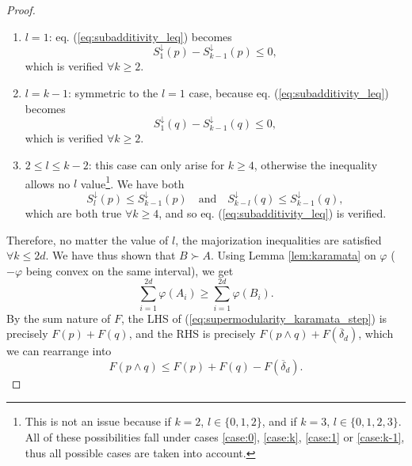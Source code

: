 \begin{proof}
\begin{enumerate}[resume]
        \item \underline{$l = 1$}: eq. (\ref{eq:subadditivity_leq}) becomes \label{case:1}
        \begin{equation}
            S^\downarrow_1(p) - S^\downarrow_{k-1}(p) \leq 0,
        \end{equation}
        which is verified $\forall k \geq 2$.
        \item \underline{$l = k - 1$}: symmetric to the $l = 1$ case, because eq. (\ref{eq:subadditivity_leq}) becomes \label{case:k-1}
        \begin{equation}
            S^\downarrow_1(q) - S^\downarrow_{k-1}(q) \leq 0,
        \end{equation}
        which is verified $\forall k \geq 2$.
        \item \underline{$2 \leq l \leq k-2$}: this case can only arise for $k \geq 4$, otherwise the inequality allows no $l$ value\footnote{This is not an issue because if $k=2$, $l \in \{0, 1, 2\}$, and if $k = 3$, $l \in \{0, 1, 2, 3\}$. All of these possibilities fall under cases \ref{case:0}, \ref{case:k}, \ref{case:1} or \ref{case:k-1}, thus all possible cases are taken into account.}. We have both \label{case:rest}
        \begin{equation}
            S^\downarrow_l (p) \leq S^\downarrow_{k-1}(p) \quad \text{and} \quad S^\downarrow_{k-l} (q) \leq S^\downarrow_{k-1}(q),
        \end{equation}
        which are both true $\forall k \geq 4$, and so eq. (\ref{eq:subadditivity_leq}) is verified. %
    \end{enumerate}
    Therefore, no matter the value of $l$, the majorization inequalities are satisfied $\forall k \leq 2d$. We have thus shown that $B \succ A$.
    Using Lemma \ref{lem:karamata} on $\varphi$ ($-\varphi$ being convex on the same interval), we get
    \begin{equation} \label{eq:subadditivity_karamata_step}
        \sum_{i=1}^{2d} \varphi(A_i) \geq \sum_{i=1}^{2d} \varphi(B_i).
    \end{equation}
    By the sum nature of $F$, the LHS of (\ref{eq:supermodularity_karamata_step}) is precisely $F(p) + F(q)$, and the RHS is precisely $F(p \wedge q) + F(\overline{\delta}_d)$, which we can rearrange into
    \begin{equation}
        F(p \wedge q) \leq F(p) + F(q) - F(\overline{\delta}_d).
    \end{equation}
\end{proof}

